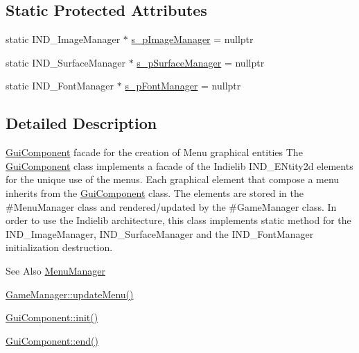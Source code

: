 \subsection*{Static Protected Attributes}
\begin{DoxyCompactItemize}
\item 
static I\-N\-D\-\_\-\-Image\-Manager $\ast$ \hyperlink{class_symp_1_1_gui_component_a7e1826a68cccf9b7a922e5f4176dba97}{s\-\_\-p\-Image\-Manager} = nullptr
\item 
static I\-N\-D\-\_\-\-Surface\-Manager $\ast$ \hyperlink{class_symp_1_1_gui_component_a768d28ae7ffce1d8a8025e6204f82ee5}{s\-\_\-p\-Surface\-Manager} = nullptr
\item 
static I\-N\-D\-\_\-\-Font\-Manager $\ast$ \hyperlink{class_symp_1_1_gui_component_a4c817ae1da9423d19b7d7455c29c614a}{s\-\_\-p\-Font\-Manager} = nullptr
\end{DoxyCompactItemize}


\subsection{Detailed Description}
\hyperlink{class_symp_1_1_gui_component}{Gui\-Component} facade for the creation of Menu graphical entities The \hyperlink{class_symp_1_1_gui_component}{Gui\-Component} class implements a facade of the Indielib I\-N\-D\-\_\-\-E\-Ntity2d elements for the unique use of the menus. Each graphical element that compose a menu inherits from the \hyperlink{class_symp_1_1_gui_component}{Gui\-Component} class. The elements are stored in the \#\-Menu\-Manager class and rendered/updated by the \#\-Game\-Manager class. In order to use the Indielib architecture, this class implements static method for the I\-N\-D\-\_\-\-Image\-Manager, I\-N\-D\-\_\-\-Surface\-Manager and the I\-N\-D\-\_\-\-Font\-Manager initialization destruction. 

\begin{DoxySeeAlso}{See Also}
\hyperlink{class_symp_1_1_menu_manager}{Menu\-Manager} 

\hyperlink{class_symp_1_1_game_manager_a53eae391ee3ea958e26d60b51516c770}{Game\-Manager\-::update\-Menu()} 

\hyperlink{class_symp_1_1_gui_component_a05838e01bbf1e31f292ed4b92a520f20}{Gui\-Component\-::init()} 

\hyperlink{class_symp_1_1_gui_component_a011075cc3a09e9a4494557fcb56dff18}{Gui\-Component\-::end()} 
\end{DoxySeeAlso}



